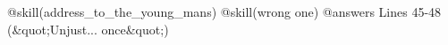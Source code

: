 @skill(address_to_the_young_mans)
@skill(wrong one)
@answers
Lines 45-48 (&quot;Unjust... once&quot;)
